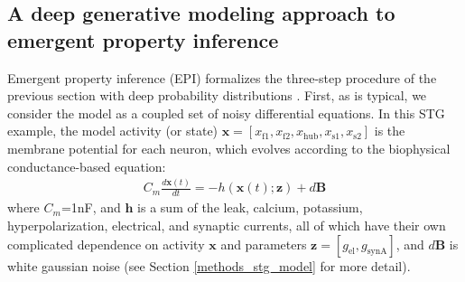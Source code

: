 \documentclass[11pt]{article}
\begin{document}
\subsection{A deep generative modeling approach to emergent property inference} \label{results_dgm}
Emergent property inference (EPI) formalizes the three-step procedure of the previous section with deep probability distributions \cite{rezende2015variational, papamakarios2019normalizing}.
First, as is typical, we consider the model as a coupled set of noisy differential equations.  
In this STG example, the model activity (or state) $\mathbf{x} = \left[ x_{\text{f1}}, x_{\text{f2}}, x_{\text{hub}}, x_{\text{s1}}, x_{\text{s2}} \right]$ is the membrane potential for each neuron, which evolves according to the biophysical conductance-based equation:
\begin{equation} \label{eq:STG_model1}
\begin{split}
C_m \frac{d\mathbf{x}(t)}{dt} = -h(\mathbf{x}(t); \mathbf{z}) + d\mathbf{B}
 \end{split}
\end{equation} 
where $C_m$=1nF, and $\mathbf{h}$ is a sum of the leak, calcium, potassium, hyperpolarization, electrical, and synaptic currents, all of which have their own complicated dependence on activity $\mathbf{x}$ and parameters $\mathbf{z} = [g_{\text{el}}, g_{\text{synA}}]$, and $d\mathbf{B}$ is white gaussian noise \cite{gutierrez2013multiple} (see Section \ref{methods_stg_model} for more detail).
\end{document}
